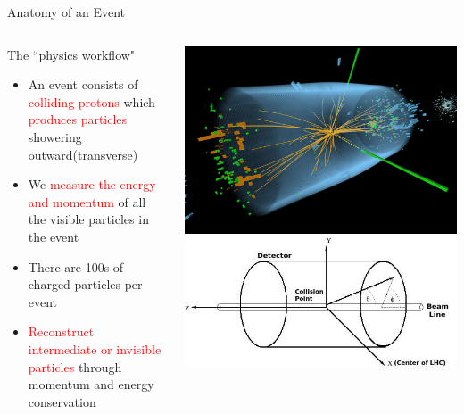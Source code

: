 \documentclass[10pt,handout]{beamer}
\begin{document}
\begin{frame}{Anatomy of an Event}
\begin{columns}
\begin{column}{0.5\textwidth}
The ``physics workflow" 
\begin{itemize}
\small
\item An event consists of \textcolor{red}{colliding protons} which \textcolor{red}{produces particles} showering outward(transverse)\\

\item We \textcolor{red}{measure the energy and momentum} of all the visible particles in the event

\item There are 100s of charged particles per event\\

\item \textcolor{red}{Reconstruct intermediate or invisible particles} through momentum and energy conservation
\end{itemize}

\end{column}
\begin{column}{0.5\textwidth}
\includegraphics[scale=.12]{cms-event.jpg}\\
\includegraphics[scale=.2]{coords.png}
\end{column}
\end{columns}



\end{frame}
\end{document}
